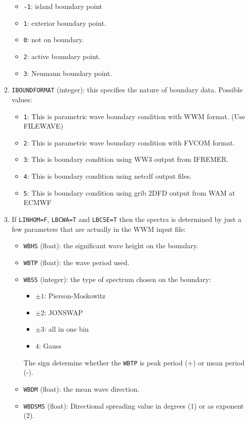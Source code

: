 \documentclass[12pt]{amsart}
\begin{document}
\begin{enumerate}
  \begin{itemize}
  \item {\tt -1}: island boundary point
  \item {\tt 1}: exterior boundary point.
  \item {\tt 0}: not on boundary.
  \item {\tt 2}: active boundary point.
  \item {\tt 3}: Neumann boundary point.
  \end{itemize}
\item {\tt IBOUNDFORMAT} (integer): this specifies the nature of boundary data. Possible values:
  \begin{itemize}
  \item {\tt 1}: This is parametric wave boundary condition with WWM format. (Use FILEWAVE)
  \item {\tt 2}: This is parametric wave boundary condition with FVCOM format. 
  \item {\tt 3}: This is boundary condition using WW3 output from IFREMER.
  \item {\tt 4}: This is boundary condition using netcdf output files.
  \item {\tt 5}: This is boundary condition using grib 2DFD output from WAM at ECMWF
  \end{itemize}
\item If {\tt LINHOM=F}, {\tt LBCWA=T} and {\tt LBCSE=T} then the spectra is determined by just a few parameters that are actually in the WWM input file:
  \begin{itemize}
  \item {\tt WBHS} (float): the significant wave height on the boundary.
  \item {\tt WBTP} (float): the wave period used.
  \item {\tt WBSS} (integer): the type of spectrum chosen on the boundary:
    \begin{itemize}
    \item $\pm 1$: Pierson-Moskowitz
    \item $\pm 2$: JONSWAP
    \item $\pm 3$: all in one bin
    \item $4$: Gauss
    \end{itemize}
    The sign determine whether the {\tt WBTP} is peak period (+) or mean period (-).
  \item {\tt WBDM} (float): the mean wave direction.
  \item {\tt WBDSMS} (float): Directional spreading value in degrees (1) or as exponent (2).

\end{itemize}
\end{enumerate}
\end{document}
